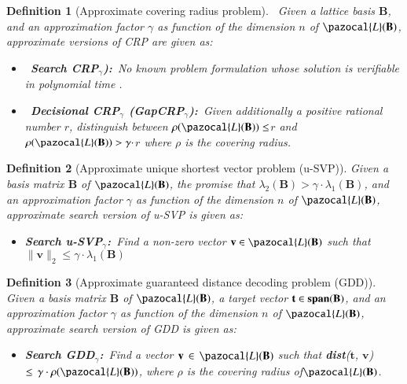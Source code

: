 \documentclass[10pt]{elsarticle}
\newtheorem{definition}{Definition}
\begin{document}
\begin{definition}[Approximate covering radius problem]
\normalfont\label{crpg}~Given a lattice basis $\mathbf{B}$, and an
approximation factor $\gamma$ as function of the dimension $n$ of
$\pazocal{L}(\mathbf{B})$, approximate versions of CRP are given as:

\begin{itemize}
\item~\textbf{Search CRP$_{\gamma}$):}~No known problem formulation whose solution is verifiable in polynomial time
\cite{CRHF_Goldwasser}.

\item~\textbf{Decisional CRP$_{\gamma}$ (GapCRP$_{\gamma}$):}~Given additionally a positive rational number $r$,
distinguish between $\rho (\pazocal{L}(\mathbf{B}))\leq$$r$ and
$\rho(\pazocal{L}(\mathbf{B}))>\gamma\cdot$$r$ where $\rho$ is the
covering radius.
\end{itemize}
\end{definition}

\begin{definition}[Approximate unique shortest vector problem (u-SVP)]
\normalfont Given a basis matrix $\mathbf{B}$ of
$\pazocal{L}(\mathbf{B})$, the promise that
$\lambda_{2}(\mathbf{B})>\gamma\cdot\lambda_{1}(\mathbf{B})$, and an
approximation factor $\gamma$ as function of the dimension $n$ of
$\pazocal{L}(\mathbf{B})$, approximate search version of u-SVP is
given as:
\begin{itemize}
\item \textbf{Search u-SVP$_{\gamma}$:}~Find a non-zero vector
$\mathbf{v}\in\pazocal{L}(\mathbf{B})$ such that $\parallel
\mathbf{v}\parallel_{2}\leq\gamma\cdot\lambda _{1}(\mathbf{B})$
\end{itemize}
\end{definition}

\begin{definition}[Approximate guaranteed distance decoding problem (GDD)]
\normalfont Given a basis matrix $\mathbf{B}$ of
$\pazocal{L}(\mathbf{B})$, a target vector
$\mathbf{t}\in\mbox{\textbf{span}}(\mathbf{B})$, and an
approximation factor $\gamma$ as function of the dimension $n$ of
$\pazocal{L}(\mathbf{B})$, approximate search version of GDD is
given as:
\begin{itemize}
\item\textbf{Search GDD$_{\gamma}$:}~Find a vector $\mathbf{v} \, \in \,
\pazocal{L}(\mathbf{B})$ such that \textbf{dist}($\mathbf{t}$,
$\mathbf{v}$) $\leq \, \gamma\cdot\rho(\pazocal{L}(\mathbf{B}))$,
where $\rho$ is the covering radius of$\pazocal{L}(\mathbf{B})$.
\end{itemize}
\end{definition}
\end{document}
